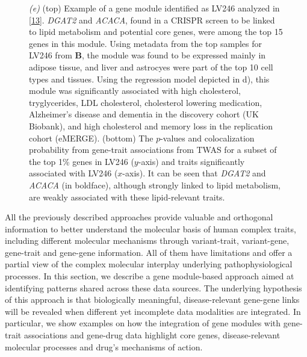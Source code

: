 \begin{figure}
{{\emph{(e)} (top) Example of a gene module identified as LV246 analyzed in {[}\protect\hyperlink{ref-NM3rHx1i}{13}{]}.
\emph{DGAT2} and \emph{ACACA}, found in a CRISPR screen to be linked to lipid metabolism and potential core genes, were among the top 15 genes in this module.
Using metadata from the top samples for LV246 from \(\mathbf{B}\), the module was found to be expressed mainly in adipose tissue, and liver and astrocyes were part of the top 10 cell types and tissues.
Using the regression model depicted in d), this module was significantly associated with high cholesterol, tryglycerides, LDL cholesterol, cholesterol lowering medication, Alzheimer's disease and dementia in the discovery cohort (UK Biobank), and high cholesterol and memory loss in the replication cohort (eMERGE).
(bottom) The \(p\)-values and colocalization probability from gene-trait associations from TWAS for a subset of the top 1\% genes in LV246 (\(y\)-axis) and traits significantly associated with LV246 (\(x\)-axis).
It can be seen that \emph{DGAT2} and \emph{ACACA} (in boldface), although strongly linked to lipid metabolism, are weakly associated with these lipid-relevant traits.}\label{fig:fig4}
}
\end{figure}

All the previously described approaches provide valuable and orthogonal information to better understand the molecular basis of human complex traits, including different molecular mechanisms through variant-trait, variant-gene, gene-trait and gene-gene information.
All of them have limitations and offer a partial view of the complex molecular interplay underlying pathophysiological processes.
In this section, we describe a gene module-based approach aimed at identifying patterns shared across these data sources.
The underlying hypothesis of this approach is that biologically meaningful, disease-relevant gene-gene links will be revealed when different yet incomplete data modalities are integrated.
In particular, we show examples on how the integration of gene modules with gene-trait associations and gene-drug data highlight core genes, disease-relevant molecular processes and drug's mechanisms of action.

